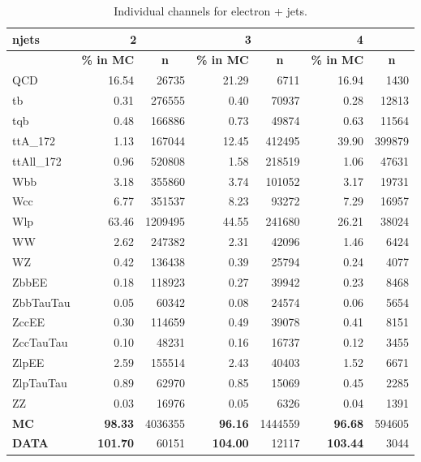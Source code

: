 \begin{table}[t] \footnotesize
\centering
\caption{Individual channels for electron + jets.}
\begin{tabular}{|l|r|r|r|r|r|r|}
\hline
\textbf{njets} & \multicolumn{2}{c|}{\textbf{2}} & \multicolumn{2}{c|}{\textbf{3}} & \multicolumn{2}{c|}{\textbf{4}} \\ \hline
\textbf{} & \multicolumn{1}{l|}{\textbf{\%  in MC}} & \multicolumn{1}{c|}{\textbf{n}} & \multicolumn{1}{l|}{\textbf{\%  in MC}} & \multicolumn{1}{c|}{\textbf{n}} & \multicolumn{1}{l|}{\textbf{\%  in MC}} & \multicolumn{1}{c|}{\textbf{n}} \\ \hline
\textsf{QCD} & 16.54 & 26735 & 21.29 & 6711 & 16.94 & 1430 \\ \hline
\textsf{tb} & 0.31 & 276555 & 0.40 & 70937 & 0.28 & 12813 \\ \hline
\textsf{tqb} & 0.48 & 166886 & 0.73 & 49874 & 0.63 & 11564 \\ \hline
\textsf{ttA\_172} & 1.13 & 167044 & 12.45 & 412495 & 39.90 & 399879 \\ \hline
\textsf{ttAll\_172} & 0.96 & 520808 & 1.58 & 218519 & 1.06 & 47631 \\ \hline
\textsf{Wbb} & 3.18 & 355860 & 3.74 & 101052 & 3.17 & 19731 \\ \hline
\textsf{Wcc} & 6.77 & 351537 & 8.23 & 93272 & 7.29 & 16957 \\ \hline
\textsf{Wlp} & 63.46 & 1209495 & 44.55 & 241680 & 26.21 & 38024 \\ \hline
\textsf{WW} & 2.62 & 247382 & 2.31 & 42096 & 1.46 & 6424 \\ \hline
\textsf{WZ} & 0.42 & 136438 & 0.39 & 25794 & 0.24 & 4077 \\ \hline
\textsf{ZbbEE} & 0.18 & 118923 & 0.27 & 39942 & 0.23 & 8468 \\ \hline
\textsf{ZbbTauTau} & 0.05 & 60342 & 0.08 & 24574 & 0.06 & 5654 \\ \hline
\textsf{ZccEE} & 0.30 & 114659 & 0.49 & 39078 & 0.41 & 8151 \\ \hline
\textsf{ZccTauTau} & 0.10 & 48231 & 0.16 & 16737 & 0.12 & 3455 \\ \hline
\textsf{ZlpEE} & 2.59 & 155514 & 2.43 & 40403 & 1.52 & 6671 \\ \hline
\textsf{ZlpTauTau} & 0.89 & 62970 & 0.85 & 15069 & 0.45 & 2285 \\ \hline
\textsf{ZZ} & 0.03 & 16976 & 0.05 & 6326 & 0.04 & 1391 \\ \hline \hline
\textbf{MC} & \textbf{98.33} & 4036355 & \textbf{96.16} & 1444559 & \textbf{96.68} & 594605 \\ \hline
\textbf{DATA} & \textbf{101.70} & 60151 & \textbf{104.00} & 12117 & \textbf{103.44} & 3044 \\ \hline
\end{tabular}
\label{tab:chnl-ele}
\end{table}
